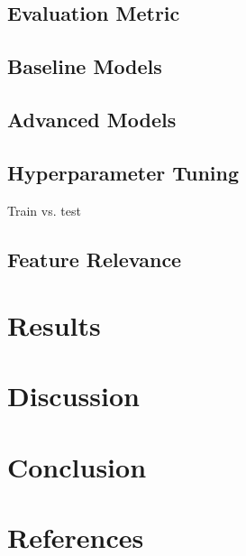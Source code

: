 \documentclass{article}
\begin{document}
	\subsection{Evaluation Metric}
	
	\subsection{Baseline Models}
	
	\subsection{Advanced Models}
	
	\subsection{Hyperparameter Tuning}
	
	Train vs. test
	
	\subsection{Feature Relevance}
	
	\section{Results}
	
	
	
	\section{Discussion}
	
	\section{Conclusion}
	
	\section{References}
	
	\cite{radioactivedecay2}
	\cite{DLS1}  

	
\printbibliography
\end{document}
